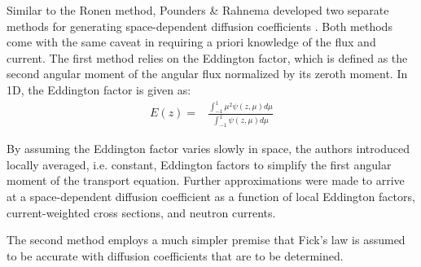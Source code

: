 Similar to the Ronen method, Pounders \& Rahnema developed two separate methods for generating
space-dependent diffusion coefficients \cite{pounders_diffusion_2009}. Both methods come with the
same caveat in requiring a priori knowledge of the flux and current. The first method relies on the
Eddington factor, which is defined as the second angular moment of the angular flux normalized by
its zeroth moment. In 1D, the Eddington factor is given as:
%
\begin{align}
  E(z) =& \frac{\int^1_{-1} \mu^2\psi(z,\mu)d\mu}{\int^1_{-1} \psi(z,\mu)d\mu}
\end{align}

By assuming the Eddington factor varies slowly in space, the authors introduced locally averaged,
i.e. constant, Eddington factors to simplify the first angular moment of the transport equation.
Further approximations were made to arrive at a space-dependent diffusion coefficient as a function
of local Eddington factors, current-weighted cross sections, and neutron currents. 

The second method employs a much simpler premise that Fick's law is assumed to be accurate with
diffusion coefficients that are to be determined. 
